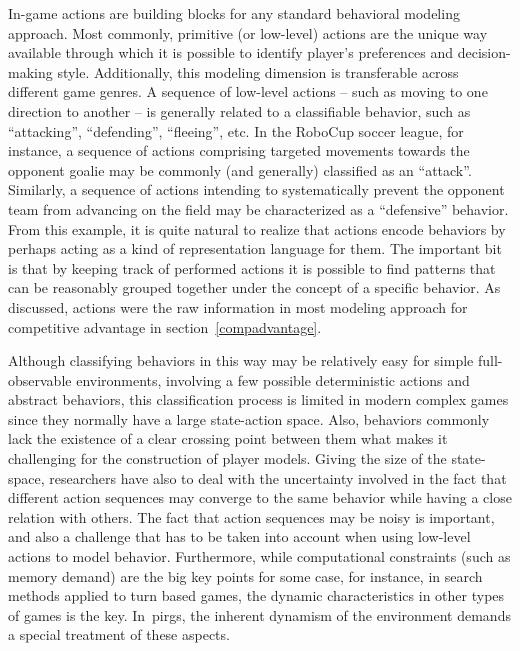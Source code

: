 In-game actions are building blocks for any standard behavioral modeling approach. Most commonly, primitive (or low-level) actions are the unique way available through which it is possible to identify player's preferences and decision-making style. Additionally, this modeling dimension is transferable across different game genres. A sequence of low-level actions -- such as moving to one direction to another -- is generally related to a classifiable behavior, such as ``attacking'', ``defending'', ``fleeing'', etc. In the RoboCup soccer league, for instance, a sequence of actions comprising targeted movements towards the opponent goalie may be commonly (and generally) classified as an ``attack''. Similarly, a sequence of actions intending to systematically prevent the opponent team from advancing on the field may be characterized as a ``defensive'' behavior. From this example, it is quite natural to realize that actions encode behaviors by perhaps acting as a kind of representation language for them. The important bit is that by keeping track of performed actions it is possible to find patterns that can be reasonably grouped together under the concept of a specific behavior. As discussed, actions were the raw information in most modeling approach for competitive advantage in section~\ref{compadvantage}.

Although classifying behaviors in this way may be relatively easy for simple full-observable environments, involving a few possible deterministic actions and abstract behaviors, this classification process is limited in modern complex games since they normally have a large state-action space. Also, behaviors commonly lack the existence of a clear crossing point between them what makes it challenging for the construction of player models. Giving the size of the state-space, researchers have also to deal with the uncertainty involved in the fact that different action sequences may converge to the same behavior while having a close relation with others. The fact that action sequences may be noisy is important, and also a challenge that has to be taken into account when using low-level actions to model behavior.  Furthermore, while computational constraints (such as memory demand) are the big key points for some case, for instance, in search methods applied to turn based games, the dynamic characteristics in other types of games is the key. In~\gls{pirg}s, the inherent dynamism of the environment demands a special treatment of these aspects.

